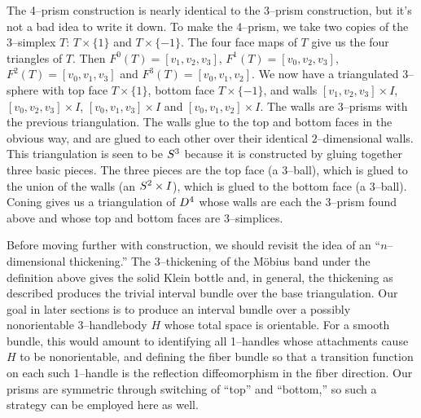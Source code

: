 The 4--prism construction is nearly identical to the 3--prism construction, but it's not a bad idea to write it down.
To make the 4--prism, we take two copies of the 3--simplex $T$: $T\times\{1\}$ and $T\times\{-1\}$.
The four face maps of $T$ give us the four triangles of $T$.
Then $F^0(T)=[v_1,v_2,v_3]$, $F^1(T)=[v_0,v_2,v_3]$, $F^2(T)=[v_0,v_1,v_3]$ and $F^3(T)=[v_0,v_1,v_2]$.
We now have a triangulated 3--sphere with top face $T\times\{1\}$, bottom face $T\times\{-1\}$, and walls $[v_1,v_2,v_3]\times I$, $[v_0,v_2,v_3]\times I$, $[v_0,v_1,v_3]\times I$ and $[v_0,v_1,v_2]\times I$.
The walls are 3--prisms with the previous triangulation.
The walls glue to the top and bottom faces in the obvious way, and are glued to each other over their identical $2$--dimensional walls.
This triangulation is seen to be $S^3$ because it is constructed by gluing together three basic pieces.
The three pieces are the top face (a 3--ball), which is glued to the union of the walls (an $S^2\times I$), which is glued to the bottom face (a 3--ball).
Coning gives us a triangulation of $D^4$ whose walls are each the 3--prism found above and whose top and bottom faces are 3--simplices.

\begin{rmk} 
  Before moving further with construction, we should revisit the idea of an ``$n$--dimensional thickening.''
  The 3--thickening of the M\"obius band under the definition above gives the solid Klein bottle and, in general, the thickening as described produces the trivial interval bundle over the base triangulation.
  Our goal in later sections is to produce an interval bundle over a possibly nonorientable 3--handlebody $H$ whose total space is orientable.
  For a smooth bundle, this would amount to identifying all 1--handles whose attachments cause $H$ to be nonorientable, and defining the fiber bundle so that a transition function on each such 1--handle is the reflection diffeomorphism in the fiber direction.
  Our prisms are symmetric through switching of ``top'' and ``bottom,'' so such a strategy can be employed here as well.
\end{rmk}